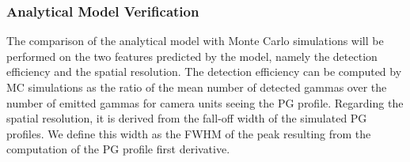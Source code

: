 \documentclass[a4paper,english,12pt]{article}
\newcommand{\mr}[2]{\multirow{#1}{*}{#2}}
\begin{document}




\subsubsection{Analytical Model Verification}

The comparison of the analytical model with Monte Carlo simulations will be performed on the two features predicted by the model, namely the detection efficiency and the spatial resolution. The detection efficiency can be computed by MC simulations as the ratio of the mean number of detected gammas over the number of emitted gammas for camera units seeing the PG profile. Regarding the spatial resolution, it is derived from the fall-off width of the simulated PG profiles. We define this width as the FWHM of the peak resulting from the computation of the PG profile first derivative. 
\end{document}
